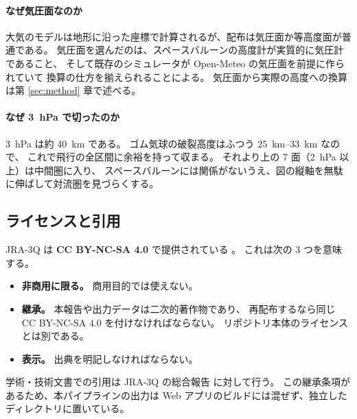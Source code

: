 \paragraph{なぜ気圧面なのか}
大気のモデルは地形に沿った座標で計算されるが、配布は気圧面か等高度面が普通である。
気圧面を選んだのは、スペースバルーンの高度計が実質的に気圧計であること、
そして既存のシミュレータが Open-Meteo の気圧面を前提に作られていて
換算の仕方を揃えられることによる。
気圧面から実際の高度への換算は第 \ref{sec:method} 章で述べる。

\paragraph{なぜ \SI{3}{\hecto\pascal} で切ったのか}
\SI{3}{\hecto\pascal} は約 \SI{40}{\kilo\metre} である。
ゴム気球の破裂高度はふつう \SIrange{25}{33}{\kilo\metre} なので、
これで飛行の全区間に余裕を持って収まる。
それより上の 7 面（\SI{2}{\hecto\pascal} 以上）は中間圏に入り、
スペースバルーンには関係がないうえ、図の縦軸を無駄に伸ばして対流圏を見づらくする。

\subsection{ライセンスと引用}

JRA-3Q は \textbf{CC BY-NC-SA 4.0} で提供されている \citep{gdex_d640000}。
これは次の 3 つを意味する。

\begin{itemize}
  \item \textbf{非商用に限る。} 商用目的では使えない。
  \item \textbf{継承。} 本報告や出力データは二次的著作物であり、
        再配布するなら同じ CC BY-NC-SA 4.0 を付けなければならない。
        リポジトリ本体のライセンスとは別である。
  \item \textbf{表示。} 出典を明記しなければならない。
\end{itemize}

学術・技術文書での引用は JRA-3Q の総合報告 \citep{kosaka2024jra3q} に対して行う。
この継承条項があるため、本パイプラインの出力は
Web アプリのビルドには混ぜず、独立したディレクトリに置いている。
